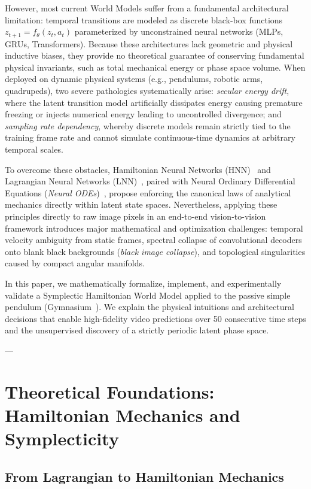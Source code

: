 \documentclass[11pt]{article}
\begin{document}
However, most current World Models suffer from a fundamental architectural limitation: temporal transitions are modeled as discrete black-box functions $z_{t+1} = f_\theta(z_t, a_t)$ parameterized by unconstrained neural networks (MLPs, GRUs, Transformers). Because these architectures lack geometric and physical inductive biases, they provide no theoretical guarantee of conserving fundamental physical invariants, such as total mechanical energy or phase space volume. When deployed on dynamic physical systems (e.g., pendulums, robotic arms, quadrupeds), two severe pathologies systematically arise: \textit{secular energy drift}, where the latent transition model artificially dissipates energy causing premature freezing or injects numerical energy leading to uncontrolled divergence; and \textit{sampling rate dependency}, whereby discrete models remain strictly tied to the training frame rate and cannot simulate continuous-time dynamics at arbitrary temporal scales.

To overcome these obstacles, Hamiltonian Neural Networks (HNN)~\cite{greydanus2019hamiltonian} and Lagrangian Neural Networks (LNN)~\cite{cranmer2020lagrangian}, paired with Neural Ordinary Differential Equations (\textit{Neural ODEs})~\cite{chen2018neural}, propose enforcing the canonical laws of analytical mechanics directly within latent state spaces. Nevertheless, applying these principles directly to raw image pixels in an end-to-end vision-to-vision framework introduces major mathematical and optimization challenges: temporal velocity ambiguity from static frames, spectral collapse of convolutional decoders onto blank black backgrounds (\textit{black image collapse}), and topological singularities caused by compact angular manifolds.

In this paper, we mathematically formalize, implement, and experimentally validate a Symplectic Hamiltonian World Model applied to the passive simple pendulum (Gymnasium~\cite{gymnasium_2025}). We explain the physical intuitions and architectural decisions that enable high-fidelity video predictions over 50 consecutive time steps and the unsupervised discovery of a strictly periodic latent phase space.

---

\section{Theoretical Foundations: Hamiltonian Mechanics and Symplecticity}
\label{sec:hamilton}

\subsection{From Lagrangian to Hamiltonian Mechanics}
\end{document}
